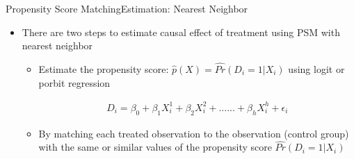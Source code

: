 \documentclass[hyperref={pdfpagelabels=false}]{beamer}
\begin{document}
\begin{frame}{Propensity Score Matching}{Estimation: Nearest Neighbor}
	\begin{itemize}
		\item There are two steps to estimate causal effect of treatment using PSM with nearest neighbor
		\vspace{0.2cm}
		\begin{itemize}
			\item[1] Estimate the propensity score: $\hat{p}(X)=\hat{Pr}(D_{i}=1|X_{i})$  using logit or porbit regression
			
	
		\begin{eqnarray*}
			D_{i} = \beta_{0}  + \beta_{1} X^{1}_{i}  + \beta_{2} X^{2}_{i}  + ...... + \beta_{h} X^{h}_{i}  + \epsilon_{i}
		\end{eqnarray*}	
			
			
			\item[2] By matching each treated observation
			to the observation (control group) with the same or similar values of the propensity score $\hat{Pr}(D_{i}=1|X_{i})$
		\end{itemize}
		
	\end{itemize}
\end{frame}
\end{document}
